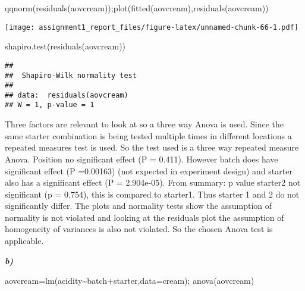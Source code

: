 \documentclass[
]{article}
\newenvironment{Shaded}{\begin{snugshade}}{\end{snugshade}}
\newcommand{\AttributeTok}[1]{\textcolor[rgb]{0.77,0.63,0.00}{#1}}
\newcommand{\FunctionTok}[1]{\textcolor[rgb]{0.00,0.00,0.00}{#1}}
\newcommand{\NormalTok}[1]{#1}
\newcommand{\OtherTok}[1]{\textcolor[rgb]{0.56,0.35,0.01}{#1}}
\newcommand{\SpecialCharTok}[1]{\textcolor[rgb]{0.00,0.00,0.00}{#1}}
\begin{document}
\begin{Shaded}
\begin{Highlighting}[]
\FunctionTok{qqnorm}\NormalTok{(}\FunctionTok{residuals}\NormalTok{(aovcream));}\FunctionTok{plot}\NormalTok{(}\FunctionTok{fitted}\NormalTok{(aovcream),}\FunctionTok{residuals}\NormalTok{(aovcream))}
\end{Highlighting}
\end{Shaded}

\texttt{[image: assignment1\_report\_files/figure-latex/unnamed-chunk-66-1.pdf]}

\begin{Shaded}
\begin{Highlighting}[]
\FunctionTok{shapiro.test}\NormalTok{(}\FunctionTok{residuals}\NormalTok{(aovcream))}
\end{Highlighting}
\end{Shaded}

\begin{verbatim}
## 
##  Shapiro-Wilk normality test
## 
## data:  residuals(aovcream)
## W = 1, p-value = 1
\end{verbatim}

Three factors are relevant to look at so a three way Anova is used.
Since the same starter combination is being tested multiple times in
different locations a repeated measures test is used. So the test used
is a three way repeated measure Anova. Position no significant effect (P
= 0.411). However batch does have significant effect (P =0.00163) (not
expected in experiment design) and starter also has a significant effect
(P = 2.904e-05). From summary: p value starter2 not significant (p =
0.754), this is compared to starter1. Thus starter 1 and 2 do not
significantly differ. The plots and normality tests show the assumption
of normality is not violated and looking at the residuals plot the
assumption of homogeneity of variances is also not violated. So the
chosen Anova test is applicable.

\textbf{\emph{b)}}

\begin{Shaded}
\begin{Highlighting}[]
\NormalTok{aovcream}\OtherTok{=}\FunctionTok{lm}\NormalTok{(acidity}\SpecialCharTok{\textasciitilde{}}\NormalTok{batch}\SpecialCharTok{+}\NormalTok{starter,}\AttributeTok{data=}\NormalTok{cream); }\FunctionTok{anova}\NormalTok{(aovcream)}
\end{Highlighting}
\end{Shaded}
\end{document}
